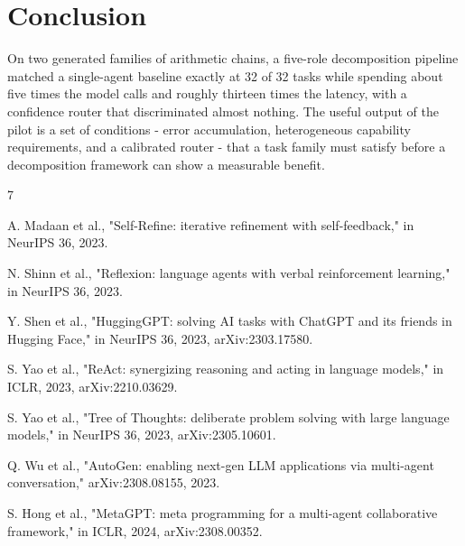 \documentclass[runningheads,a4paper]{llncs}
\begin{document}
\section{Conclusion}

On two generated families of arithmetic chains, a five-role decomposition pipeline matched a single-agent baseline exactly at 32 of 32 tasks while spending about five times the model calls and roughly thirteen times the latency, with a confidence router that discriminated almost nothing. The useful output of the pilot is a set of conditions - error accumulation, heterogeneous capability requirements, and a calibrated router - that a task family must satisfy before a decomposition framework can show a measurable benefit.

\begin{thebibliography}{7}

\small

\setlength{\itemsep}{0pt}

\setlength{\parskip}{0pt}

 A. Madaan et al., "Self-Refine: iterative refinement with self-feedback," in NeurIPS 36, 2023.

 N. Shinn et al., "Reflexion: language agents with verbal reinforcement learning," in NeurIPS 36, 2023.

 Y. Shen et al., "HuggingGPT: solving AI tasks with ChatGPT and its friends in Hugging Face," in NeurIPS 36, 2023, arXiv:2303.17580.

 S. Yao et al., "ReAct: synergizing reasoning and acting in language models," in ICLR, 2023, arXiv:2210.03629.

 S. Yao et al., "Tree of Thoughts: deliberate problem solving with large language models," in NeurIPS 36, 2023, arXiv:2305.10601.

 Q. Wu et al., "AutoGen: enabling next-gen LLM applications via multi-agent conversation," arXiv:2308.08155, 2023.

 S. Hong et al., "MetaGPT: meta programming for a multi-agent collaborative framework," in ICLR, 2024, arXiv:2308.00352.

\end{thebibliography}
\end{document}

